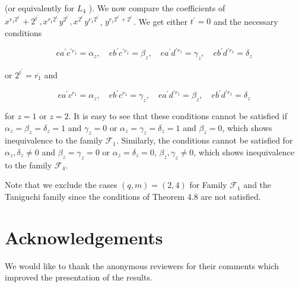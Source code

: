 \documentclass[10pt]{article}
\begin{document}
(or equivalently for $L_{4}$ ). We now compare the coefficients of $x^{r_{1} 2^{t^{\prime}}}+2^{t^{\prime}}, x^{r_{1} 2^{t^{\prime}}} y^{2^{t^{\prime}}}, x^{2^{t^{\prime}}} y^{r_{1} 2^{t^{\prime}}}$, $y^{r_{1} 2^{t^{\prime}}+2^{t^{\prime}}}$. We get either $t^{\prime}=0$ and the necessary conditions

$$
e a^{\prime} c^{\prime r_{1}}=\alpha_{z}, \quad e b^{\prime} c^{\prime r_{1}}=\beta_{z}, \quad e a^{\prime} d^{\prime r_{1}}=\gamma_{z}, \quad e b^{\prime} d^{\prime r_{1}}=\delta_{z}
$$

or $2^{t^{\prime}}=\overline{r_{1}}$ and

$$
e a^{\prime} c^{r_{1}}=\alpha_{z}, \quad e b^{\prime} c^{r_{1}}=\gamma_{z}, \quad e a^{\prime} d^{\prime r_{1}}=\beta_{z}, \quad e b^{\prime} d^{\prime r_{1}}=\delta_{z}
$$

for $z=1$ or $z=2$. It is easy to see that these conditions cannot be satisfied if $\alpha_{z}=\beta_{z}=\delta_{z}=1$ and $\gamma_{z}=0$ or $\alpha_{z}=\gamma_{z}=\delta_{z}=1$ and $\beta_{z}=0$, which shows inequivalence to the family $\mathcal{F}_{1}$. Similarly, the conditions cannot be satisfied for $\alpha_{z}, \delta_{z} \neq 0$ and $\beta_{z}=\gamma_{z}=0$ or $\alpha_{z}=\delta_{z}=0$, $\beta_{z}, \gamma_{z} \neq 0$, which shows inequivalence to the family $\mathcal{F}_{4}$.

Note that we exclude the cases $(q, m)=(2,4)$ for Family $\mathcal{F}_{1}$ and the Taniguchi family since the conditions of Theorem 4.8 are not satisfied.

\section*{Acknowledgements}
We would like to thank the anonymous reviewers for their comments which improved the presentation of the results.
\end{document}
